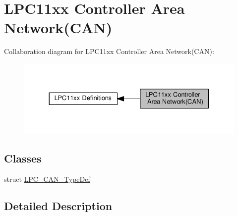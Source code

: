 \hypertarget{group___l_p_c11xx___c_a_n}{}\section{L\+P\+C11xx Controller Area Network(C\+AN)}
\label{group___l_p_c11xx___c_a_n}
Collaboration diagram for L\+P\+C11xx Controller Area Network(C\+AN)\+:\nopagebreak
\begin{figure}[H]
\begin{center}
\leavevmode
\includegraphics[width=330pt]{group___l_p_c11xx___c_a_n}
\end{center}
\end{figure}
\subsection*{Classes}
\begin{DoxyCompactItemize}
\item 
struct \hyperlink{struct_l_p_c___c_a_n___type_def}{L\+P\+C\+\_\+\+C\+A\+N\+\_\+\+Type\+Def}
\end{DoxyCompactItemize}


\subsection{Detailed Description}
